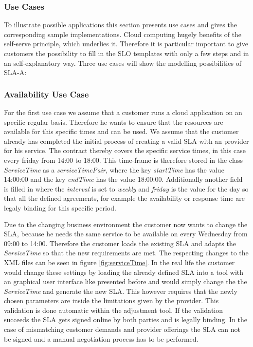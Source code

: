 \subsubsection{Use Cases}\label{usecase}
To illustrate possible applications this section presents use cases and gives the corresponding sample implementations. Cloud computing hugely benefits of the self-serve principle, which underlies it. Therefore it is particular important to give customers the possibility to fill in the SLO templates with only a few steps and in an self-explanatory way. Three use cases will show the modelling possibilities of  SLA-A:
%

\subsubsection{Availability Use Case}
For the first use case we assume that a customer runs a cloud application on an specific regular basis. Therefore he wants to ensure that the resources are available for this specific times and can be used. We assume that the customer already has completed the initial process of creating a valid SLA with an provider for his service. The contract thereby covers the specific service times, in this case every friday from 14:00 to 18:00. This time-frame is therefore stored in the class {\it ServiceTime} as a {\it serviceTimePair}, where the key {\it startTime} has the value 14:00:00 and the key {\it endTime} has the value 18:00:00. Additionally another field is filled in where the {\it interval} is  set to {\it weekly} and {\it friday} is the value for the day so that all the defined agreements, for example the availability  or response time are legaly binding for this specific period.

Due to the changing business environment the customer now wants to change the SLA, because he needs the same service to be available on every Wednesday from 09:00 to 14:00. Therefore the customer loads the existing SLA and adapts the {\it ServiceTime} so that the new requirements are met. The respecting changes to the XML files can be seen in figure \ref{fig:serviceTime}. In the real life the customer would change these settings by loading the already defined SLA into a tool with an graphical user interface like presented before and would simply change the the {\it ServiceTime} and generate the new SLA. This however requires that the newly chosen parameters are inside the limitations given by the provider. This validation is done automatic within the adjustment tool. If the validation succeeds the SLA gets signed online by both parties and is legally binding. In the case of mismatching customer demands and provider offerings the SLA can not be signed and a manual negotiation process has to be performed.

